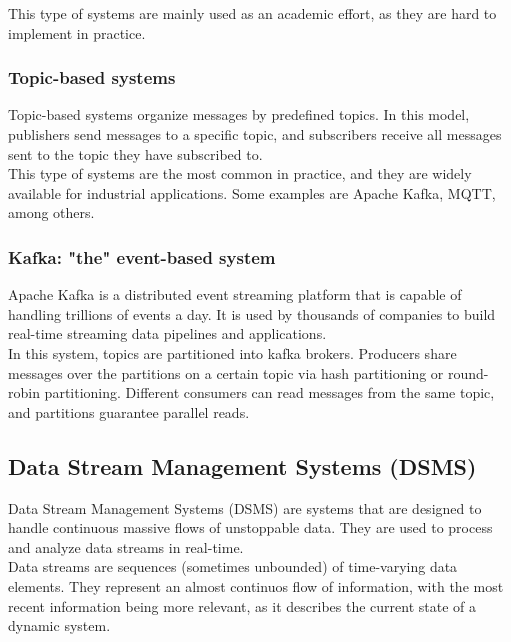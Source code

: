This type of systems are mainly used as an academic effort, as they are hard to implement
in practice.

\subsubsection{Topic-based systems}

Topic-based systems organize messages by predefined topics. In this model, publishers
send messages to a specific topic, and subscribers receive all messages sent to the topic
they have subscribed to.\\

This type of systems are the most common in practice, and they are widely available for
industrial applications. Some examples are Apache Kafka, MQTT, among others.

\subsubsection{Kafka: "the" event-based system}

Apache Kafka is a distributed event streaming platform that is capable of handling trillions
of events a day. It is used by thousands of companies to build real-time streaming data pipelines
and applications.\\

In this system, topics are partitioned into kafka brokers. Producers share messages over
the partitions on a certain topic via hash partitioning or round-robin partitioning. 
Different consumers can read messages from the same topic, and partitions guarantee
parallel reads.\\

\subsection{Data Stream Management Systems (DSMS)}

Data Stream Management Systems (DSMS) are systems that are designed to handle
continuous massive flows of unstoppable data. They are used to process and analyze
data streams in real-time.\\

Data streams are sequences (sometimes unbounded) of time-varying data elements. They 
represent an almost continuos flow of information, with the most recent information
being more relevant, as it describes the current state of a dynamic system.\\


